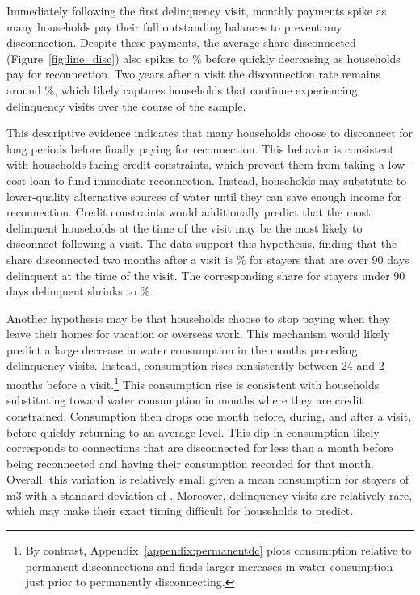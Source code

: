 \documentclass[12pt]{article}
\begin{document}
Immediately following the first delinquency visit, monthly payments spike as many households pay their full outstanding balances to prevent any disconnection.  Despite these payments, the average share disconnected (Figure~\ref{fig:line_disc}) also spikes to \unskip\% before quickly decreasing as households pay for reconnection.  Two years after a visit the disconnection rate remains around \unskip\%, which likely captures households that continue experiencing delinquency visits over the course of the sample.

This descriptive evidence indicates that many households choose to disconnect for long periods before finally paying for reconnection.  This behavior is consistent with households facing credit-constraints, which prevent them from taking a low-cost loan to fund immediate reconnection.  Instead, households may substitute to lower-quality alternative sources of water until they can save enough income for reconnection.  Credit constraints would additionally predict that the most delinquent households at the time of the visit may be the most likely to disconnect following a visit.  The data support this hypothesis, finding that the share disconnected two months after a visit is \unskip\% for stayers that are over 90 days delinquent at the time of the visit.  The corresponding share for stayers under 90 days delinquent shrinks to \unskip\%.

Another hypothesis may be that households choose to stop paying when they leave their homes for vacation or overseas work.  This mechanism would likely predict a large decrease in water consumption in the months preceding delinquency visits.  Instead, consumption rises consistently between 24 and 2 months before a visit.\footnote{By contrast, Appendix~\ref{appendix:permanentdc} plots consumption relative to permanent disconnections and finds larger increases in water consumption just prior to permanently disconnecting.}  This consumption rise is consistent with households substituting toward water consumption in months where they are credit constrained.  Consumption then drops one month before, during, and after a visit, before quickly returning to an average level.  This dip in consumption likely corresponds to connections that are disconnected for less than a month before being reconnected and having their consumption recorded for that month.  Overall, this variation is relatively small given a mean consumption for stayers of m3 with a standard deviation of \unskip.  Moreover, delinquency visits are relatively rare, which may make their exact timing difficult for households to predict.  
\end{document}
